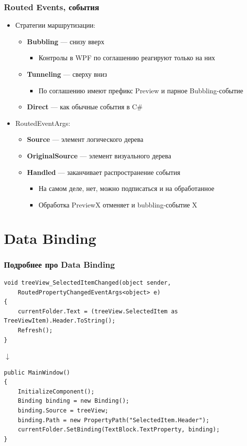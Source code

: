 \documentclass[xetex,mathserif,serif]{beamer}
\newcommand{\DownArrow} {
	\hspace{2cm}\begin{LARGE}$\downarrow$\end{LARGE}
}
\begin{document}
	\begin{frame}
		\frametitle{Routed Events, события}
		\begin{itemize}
			\item Стратегии маршрутизации:
			\begin{itemize}
				\item \textbf{Bubbling} --- снизу вверх
				\begin{itemize}
					\item Контролы в WPF по соглашению реагируют только на них
				\end{itemize}
				\item \textbf{Tunneling} --- сверху вниз
				\begin{itemize}
					\item По соглашению имеют префикс Preview и парное Bubbling-событие
				\end{itemize}
				\item \textbf{Direct} --- как обычные события в C\#
			\end{itemize}
			\item RoutedEventArgs:
			\begin{itemize}
				\item \textbf{Source} --- элемент логического дерева
				\item \textbf{OriginalSource} --- элемент визуального дерева
				\item \textbf{Handled} --- заканчивает распространение события
				\begin{itemize}
					\item На самом деле, нет, можно подписаться и на обработанное
					\item Обработка PreviewX отменяет и bubbling-событие X
				\end{itemize}
			\end{itemize}
		\end{itemize}
	\end{frame}

	\section{Data Binding}

	\begin{frame}[fragile]
		\frametitle{Подробнее про Data Binding}
		\begin{footnotesize}
			\begin{verbatim}
void treeView_SelectedItemChanged(object sender,
    RoutedPropertyChangedEventArgs<object> e)
{
    currentFolder.Text = (treeView.SelectedItem as TreeViewItem).Header.ToString();
    Refresh();
}
			\end{verbatim}
		\end{footnotesize}
		\DownArrow
		\begin{footnotesize}
			\begin{verbatim}
public MainWindow()
{
    InitializeComponent();
    Binding binding = new Binding();
    binding.Source = treeView;
    binding.Path = new PropertyPath("SelectedItem.Header");
    currentFolder.SetBinding(TextBlock.TextProperty, binding);
}
			\end{verbatim}
		\end{footnotesize}
	\end{frame}
\end{document}
